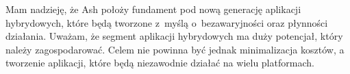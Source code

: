 \documentclass[brudnopis]{xmgr}
\begin{document}
Mam nadzieję, że Ash położy fundament pod nową generację aplikacji hybrydowych, które będą tworzone z~myślą o~bezawaryjności oraz płynności działania. Uważam, że segment aplikacji hybrydowych ma duży potencjał, który należy zagospodarować.  Celem nie powinna być jednak minimalizacja kosztów, a tworzenie aplikacji, które będą niezawodnie działać na wielu platformach.

\nocite{*}

\appendix






\oswiadczenie
\end{document}

